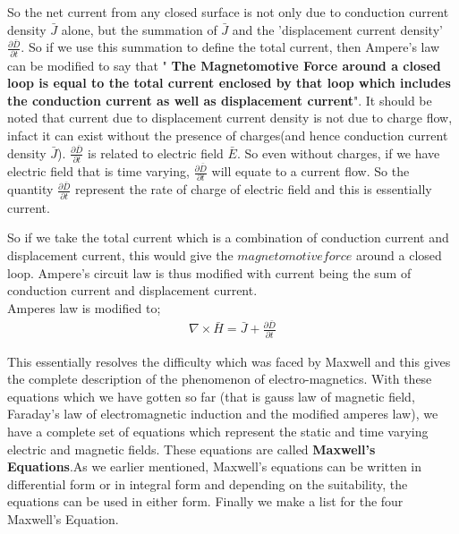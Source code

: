   
  So the net current from any closed surface is not only due to conduction current density $\bar{J}$ alone, but the summation of $\bar{J}$ and the 'displacement current density' $\frac{\partial\bar{D}}{\partial t}$. So if we use this summation to define the total current, then Ampere's law can be modified to say that " 
  \textbf{The Magnetomotive Force around a closed loop is equal to the total current enclosed by that loop which includes the conduction current as well as displacement current}". It should be noted that current due to displacement current density is not due to charge flow, infact it can exist without the presence of charges(and hence conduction current density $\bar{J}$). $\frac{\partial\bar{D}}{\partial t}$ is related to electric field $\bar{E}$. So even without charges, if we have electric field that is time varying, $\frac{\partial\bar{D}}{\partial t}$ will equate to a current flow. So the quantity $\frac{\partial\bar{D}}{\partial t}$ represent the rate of charge of electric field and this is essentially current.
  
  
  So if we take the total current which is a combination of conduction current and displacement current, this would give the $magnetomotive force$ around a closed loop.
  Ampere's circuit law is thus modified with current being the sum of conduction current and displacement current.\\
  Amperes law is modified to;
  \begin{align}
 \nabla\times\bar{H}=\bar{J}+\frac{\partial\bar{D}}{\partial t}
 \end{align}
  
  
 This essentially resolves the difficulty which was faced by Maxwell and this gives the complete description of the phenomenon of electro-magnetics. With these equations which we have gotten so far (that is gauss law of magnetic field, Faraday's law of electromagnetic induction and the modified amperes law), we have a complete set of equations which represent the static and time varying electric and magnetic fields. These equations are called \textbf{Maxwell's Equations}.As we earlier mentioned, Maxwell's equations can be written in differential form or in integral form and depending on the suitability, the equations can be used in either form. Finally we make a list for the four Maxwell's Equation.
 
